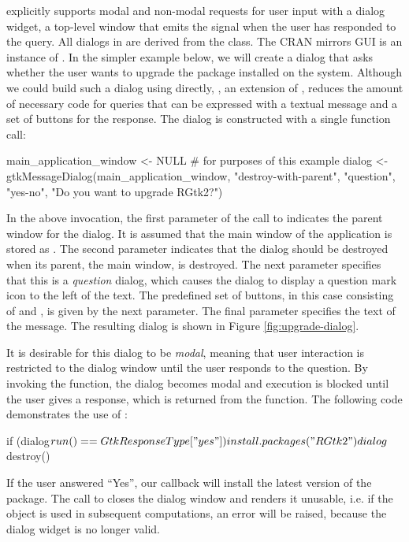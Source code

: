 \documentclass[article,shortnames]{jss}
\begin{document}
 explicitly supports modal and non-modal requests for user
input with a dialog widget, a top-level window that emits the
 signal when the user has responded to the query. All
dialogs in  are derived from the  class. The
CRAN mirrors GUI is an instance of . In the simpler
example below,
we will create a dialog that asks whether the user wants to upgrade
the  package installed on the system. Although we could
build such a dialog using  directly,
, an extension of , reduces the
amount of necessary code
for queries that can be expressed with a textual message and a
set of buttons for the response. The dialog is constructed with a
single function call:
\begin{Code}
main_application_window <- NULL # for purposes of this example
dialog <- gtkMessageDialog(main_application_window,  
                           "destroy-with-parent", "question",
                           "yes-no", "Do you want to upgrade RGtk2?")
\end{Code}
In the above invocation, the first parameter of the call to 
 indicates the parent window for the dialog. It
is assumed that the main window of the application is stored as
. The second parameter indicates that
the dialog should be destroyed when its parent, the main window, is
destroyed.  The next parameter specifies that this is a
\emph{question} dialog, which causes the dialog to display a question
mark icon to the left of the text.  The predefined set of buttons, in
this case consisting of  and , is given by the next
parameter. The final parameter specifies the text of the message.  The
resulting dialog is shown in Figure \ref{fig:upgrade-dialog}.

It is desirable for this dialog to be \emph{modal}, meaning that user
interaction
is restricted to the dialog window until the user responds to the
question. By invoking the  function, the dialog
becomes modal and execution is blocked until the user gives a
response, which is returned from the function. The following code
demonstrates the use of :
\begin{Code}
if (dialog$run() == GtkResponseType["yes"])
 install.packages("RGtk2")
dialog$destroy()
\end{Code}
If the user answered
``Yes'', our callback will install the latest version of the
 package. The call to  closes the
dialog window and renders it unusable, i.e. if the object is used in
subsequent computations, an error will be raised, because the dialog
widget is no longer valid.
\end{document}
